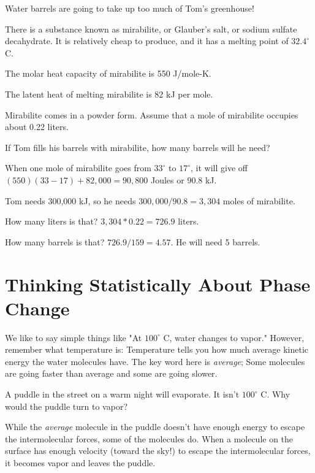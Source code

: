 \begin{Exercise}[title={Using Mirabilite For Thermal Energy Storage}, label=mirabilite]

Water barrels are going to take up too much of Tom's greenhouse!

There is a substance known as mirabilite, or Glauber's salt, or sodium sulfate decahydrate. It is relatively cheap to produce, and it has a melting point of $32.4^\circ$ C.

The molar heat capacity of mirabilite is 550 J/mole-K.

The latent heat of melting mirabilite is 82 kJ per mole.

Mirabilite comes in a powder form. Assume that a mole of mirabilite occupies about 0.22 liters.

If Tom fills his barrels with mirabilite, how many barrels will he need?

\end{Exercise}
\begin{Answer}[ref=mirabilite] 

When one mole of mirabilite goes from $33^\circ$ to $17^\circ$, it will give off $(550)(33-17) + 82,000 = 90,800$ Joules or $90.8$ kJ. 

Tom needs 300,000 kJ, so he needs $300,000/90.8 =  3,304$ moles of mirabilite.

How many liters is that? $3,304 * 0.22 = 726.9$ liters.

How many barrels is that? $726.9 / 159 = 4.57$. He will need 5 barrels.
 
\end{Answer}

\section{Thinking Statistically About Phase Change}

We like to say simple things like "At $100^\circ$ C, water changes to vapor." However, remember what
temperature is: Temperature tells you how much average kinetic energy the water molecules have.  The key word here is \emph{average}; Some molecules are going faster than average and some are going slower.

A puddle in the street on a warm night will evaporate. It isn't $100^\circ$ C. Why would the puddle turn to vapor?

While the \emph{average} molecule in the puddle doesn't have enough energy to escape the intermolecular forces, some of the molecules do. When a molecule on the surface has enough velocity (toward the sky!) to escape the intermolecular forces, it becomes vapor and leaves the puddle.

